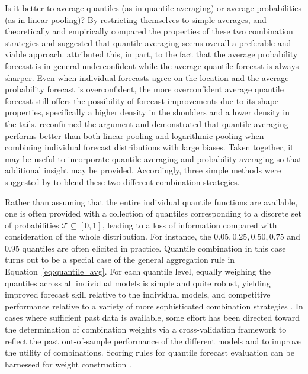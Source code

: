 \documentclass[a4paper,11pt]{article}
\begin{document}
Is it better to average quantiles (as in quantile averaging) or average probabilities (as in linear pooling)? By restricting themselves to simple averages, \citet{Lichtendahl2013-rt} and \citet{Busetti2017-ox} theoretically and empirically compared the properties of these two combination strategies and suggested that quantile averaging seems overall a preferable and viable approach. \citet{Lichtendahl2013-rt} attributed this, in part, to the fact that the average probability forecast is in general underconfident while the average quantile forecast is always sharper. Even when individual forecasts agree on the location and the average probability forecast is overconfident, the more overconfident average quantile forecast still offers the possibility of forecast improvements due to its shape properties, specifically a higher density in the shoulders and a lower density in the tails. \citet{Busetti2017-ox} reconfirmed the argument and demonstrated that quantile averaging performs better than both linear pooling and logarithmic pooling when combining individual forecast distributions with large biases. Taken together, it may be useful to incorporate quantile averaging and probability averaging so that additional insight may be provided. Accordingly, three simple methods were suggested by \citet{Lichtendahl2013-rt} to blend these two different combination strategies.

Rather than assuming that the entire individual quantile functions are available, one is often provided with a collection of quantiles corresponding to a discrete set of probabilities $\mathcal{T} \subseteq [0,1]$, leading to a loss of information compared with consideration of the whole distribution. For instance, the $0.05, 0.25, 0.50, 0.75$ and $0.95$ quantiles are often elicited in practice. Quantile combination in this case turns out to be a special case of the general aggregation rule in Equation~\eqref{eq:quantile_avg}. For each quantile level, equally weighing the quantiles across all individual models is simple and quite robust, yielding improved forecast skill relative to the individual models, and competitive performance relative to a variety of more sophisticated combination strategies \citep[e.g.,][]{Busetti2017-ox,Smyl2019-av,Ray2022-co}. In cases where sufficient past data is available, some effort has been directed toward the determination of combination weights via a cross-validation framework to reflect the past out-of-sample performance of the different models and to improve the utility of combinations. Scoring rules for quantile forecast evaluation can be harnessed for weight construction \citep{Gneiting2007-ij,Grushka-Cockayne2017-eg,Trapero2019-uh}.
\end{document}
